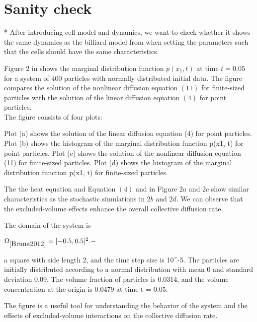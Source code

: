 \section{Sanity check}

* After introducing cell model and dynamics, we want to check whether it shows the same dynamics as the billiard model from \cite{Bruna2012} when setting the parameters such that the cells should have the same characteristics. 



Figure $2$ in \cite{Bruna2012} shows the marginal distribution function $p(x_1, t)$ at time $t = 0.05$ for a system of $400$ particles with normally distributed initial data. 
The figure compares the solution of the nonlinear diffusion equation $(11)$ for finite-sized particles with the solution of the linear diffusion equation $(4)$ for point particles. \\
The figure consists of four plots:

Plot (a) shows the solution of the linear diffusion equation (4) for point particles.
Plot (b) shows the histogram of the marginal distribution function p(x1, t) for point particles.
Plot (c) shows the solution of the nonlinear diffusion equation (11) for finite-sized particles.
Plot (d) shows the histogram of the marginal distribution function p(x1, t) for finite-sized particles.

The the heat equation and Equation $(4)$ and in Figure $2a$ and $2c$ show similar characteristics as the stochastic simulations in $2b$ and $2d$. 
We can observe that the excluded-volume effects enhance the overall collective diffusion rate.



The domain of the system is 
\begin{center}
    $
    \Omega_{\cite{Bruna2012}} = [-0.5, 0.5]^2.- 
    $
\end{center}

a square with side length 2, and the time step size is 10^-5. 
The particles are initially distributed according to a normal distribution with mean 0 and standard deviation 0.09. 
The volume fraction of particles is 0.0314, and the volume concentration at the origin is 0.0479 at time t = 0.05.

The figure is a useful tool for understanding the behavior of the system and the effects of excluded-volume interactions on the collective diffusion rate.